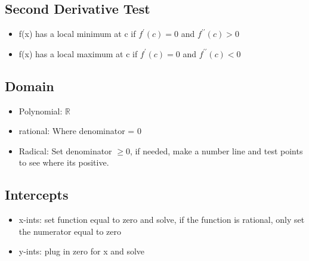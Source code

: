\documentclass{report}
\begin{document}
     \bigbreak \noindent \bigbreak \noindent 
     \subsection{Second Derivative Test}
      \begin{itemize}
       \item f(x) has a local minimum at c if $f^{\prime}(c)=0$ and $f^{\prime\prime}(c) > 0$ 
       \item f(x) has a local maximum at c if $f^{\prime}(c)=0$ and $f^{\prime\prime}(c) < 0$ 
     \end{itemize}


     \bigbreak \noindent \bigbreak \noindent 
     \subsection{Domain}
    \begin{itemize}
      \item Polynomial: $ \mathbb{R} $
      \item rational: Where denominator = 0 
      \item Radical: Set denominator $\geq 0$, if needed, make a number line and test points to see where its positive.
    \end{itemize}

    \bigbreak \noindent \bigbreak \noindent 
    \subsection{Intercepts}
    \begin{itemize}
      \item x-ints: set function equal to zero and solve, if the function is rational, only set the numerator equal to zero
      \item y-ints: plug in zero for x and solve
    \end{itemize}

    \bigbreak \noindent \bigbreak \noindent 
\end{document}
